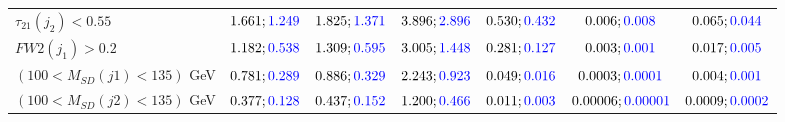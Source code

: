 \begin{landscape}
\begin{table}
\begin{tabular}{lcccccc}
			\rowcolor{black!7}$\tau_{21}(j_2)<0.55$ &$1.661;\textcolor{blue}{1.249}$ &$1.825;\textcolor{blue}{1.371}$ &$3.896;\textcolor{blue}{2.896}$&$0.530;\textcolor{blue}{0.432}$&$0.006;\textcolor{blue}{0.008}$&$0.065;\textcolor{blue}{0.044}$\\
			$FW2(j_1)>0.2$ &$1.182;\textcolor{blue}{0.538}$ &$1.309;\textcolor{blue}{0.595}$&$3.005;\textcolor{blue}{1.448}$&$0.281;\textcolor{blue}{0.127}$&$0.003;\textcolor{blue}{0.001}$&$0.017;\textcolor{blue}{0.005}$\\
			\rowcolor{black!7}$(100<M_{SD}(j1)<135)$ GeV& $0.781;\textcolor{blue}{0.289}$&$0.886;\textcolor{blue}{0.329}$&$2.243;\textcolor{blue}{0.923}$&$0.049;\textcolor{blue}{0.016}$&$0.0003;\textcolor{blue}{0.0001}$&$0.004;\textcolor{blue}{0.001}$\\
			$(100<M_{SD}(j2)<135)$ GeV &$0.377;\textcolor{blue}{0.128}$ &$0.437;\textcolor{blue}{0.152}$ &$1.200;\textcolor{blue}{0.466}$&$0.011;\textcolor{blue}{0.003}$&$0.00006;\textcolor{blue}{0.00001}$&$0.0009;\textcolor{blue}{0.0002}$\\
			\bottomrule
		\end{tabular}
	\end{table}
	

\end{landscape}
